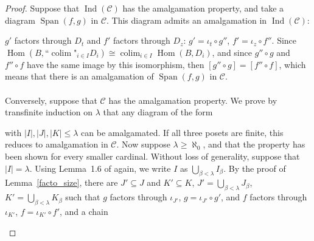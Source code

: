 \documentclass{article}
\newcommand{\fcolim}{\text{``}\colim\text{"}}
\newcommand{\Ind}{\operatorname{Ind}}
\newcommand{\Span}{\operatorname{Span}}
\newcommand{\Hom}{\operatorname{Hom}}
\newcommand{\colim}{\operatorname{colim}}
\begin{document}
\begin{proof}
    Suppose that $\Ind(\mathcal{C})$ has the amalgamation property, and take a diagram $\Span(f,g)$ in $\mathcal{C}$. This diagram admits an amalgamation in $\Ind(\mathcal{C})$:
    \begin{center}
\end{center}
$g'$ factors through $D_t$ and $f'$ factors through $D_z$: $g'=\iota_t\circ g''$, $f'=\iota_z\circ f''$. Since $\Hom(B,\fcolim_{i\in I}D_i)\cong\colim_{i\in I}\Hom(B,D_i)$, and since $g''\circ g$ and $f''\circ f$ have the same image by this isomorphism, then $[g''\circ g]=[f''\circ f]$, which means that there is an amalgamation of $\Span(f,g)$ in $\mathcal{C}$.\\
\\
Conversely, suppose that $\mathcal{C}$ has the amalgamation property. We prove by transfinite induction on $\lambda$ that any diagram of the form
\begin{center}
\end{center}
with $|I|,|J|,|K|\leq\lambda$ can be amalgamated. If all three posets are finite, this reduces to amalgamation in $\mathcal{C}$. Now suppose $\lambda\geq\aleph_0$, and that the property has been shown for every smaller cardinal. Without loss of generality, suppose that $|I|=\lambda$. Using Lemma~1.6 of \cite{rosicky1994locally} again, we write $I$ as $\bigcup_{\beta<\lambda}I_\beta$. By the proof of Lemma~\ref{facto_size}, there are $J'\subseteq J$ and $K'\subseteq K$, $J'=\bigcup_{\beta<\lambda}J_\beta$, $K'=\bigcup_{\beta<\lambda}K_\beta$ such that $g$ factors through $\iota_{J'}$, $g=\iota_{J'}\circ g'$, and $f$ factors through $\iota_{K'}$, $f=\iota_{K'}\circ f'$, and a chain
\begin{center}
\end{center}

\end{proof}
\end{document}

